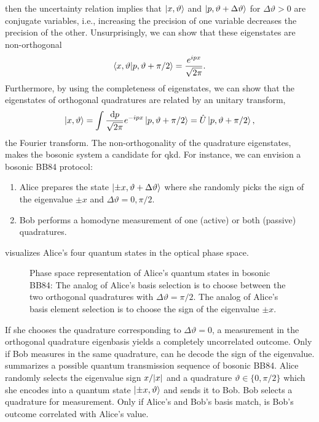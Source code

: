 then the uncertainty relation implies that $\ket{x,\vartheta}$ and $\ket{p,\vartheta+\Delta\vartheta}$ for $\Delta\vartheta>0$ are conjugate variables, i.e., increasing the precision of one variable decreases the precision of the other.
Unsurprisingly, we can show that these eigenstates are non-orthogonal~\cite[p.~29]{Mukhanov2007}
\begin{equation}
	\braket{x,\vartheta}{p,\vartheta+\pi/2}
	=
	\frac{e^{ipx}}{\sqrt{2\pi}}
	\label{eq:position_momentum_product}
	.
\end{equation}
Furthermore, by using the completeness of eigenstates, we can show that the eigenstates of orthogonal quadratures are related by an unitary transform,
\begin{equation}
	\ket{x,\vartheta}
	=
	\int\frac{\dd{p}}{\sqrt{2\pi}}
	e^{-ipx}
	\ket{p,\vartheta+\pi/2}
	=
	\hat{U}
	\ket{p,\vartheta+\pi/2}
	,
\end{equation}
the Fourier transform.
The non-orthogonality of the quadrature eigenstates, makes the bosonic system a candidate for \gls{qkd}.
For instance, we can envision a bosonic BB84 protocol:
\begin{enumerate}
	\item Alice prepares the state $\ket{\pm x,\vartheta+\Delta\vartheta}$ where she randomly picks the sign of the eigenvalue $\pm x$ and $\Delta\vartheta=0,\pi/2$.
	\item Bob performs a homodyne measurement of one (active) or both (passive) quadratures.
\end{enumerate}
 visualizes Alice's four quantum states in the optical phase space.
\begin{figure}[htb]
	\centering
	
	\caption{Phase space representation of Alice's quantum states in bosonic BB84: The analog of Alice's basis selection is to choose between the two orthogonal quadratures with $\Delta\vartheta=\pi/2$. The analog of Alice's basis element selection is to choose the sign of the eigenvalue $\pm x$.}\label{fig:phase_space_quadrature}
\end{figure}
If she chooses the quadrature corresponding to $\Delta\vartheta=0$, a measurement in the orthogonal quadrature eigenbasis yields a completely uncorrelated outcome.
Only if Bob measures in the same quadrature, can he decode the sign of the eigenvalue.
 summarizes a possible quantum transmission sequence of bosonic BB84.
Alice randomly selects the eigenvalue sign $x/\abs{x}$ and a quadrature $\vartheta\in\{0,\pi/2\}$ which she encodes into a quantum state $\ket{\pm x,\vartheta}$ and sends it to Bob. Bob selects a quadrature for measurement. Only if Alice's and Bob's basis match, is Bob's outcome correlated with Alice's value.
